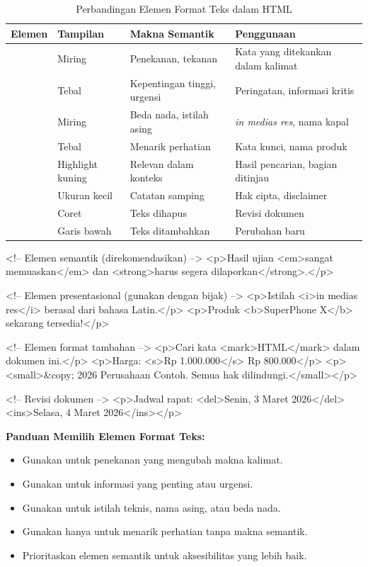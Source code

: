 \begin{table}[H]
\centering
\begin{tabular}{|P{2cm}|P{2cm}|P{3.5cm}|P{4cm}|}
\hline
\textbf{Elemen} & \textbf{Tampilan} & \textbf{Makna Semantik} & \textbf{Penggunaan} \\
\hline
{} & Miring & Penekanan, tekanan & Kata yang ditekankan dalam kalimat \\
\hline
{} & Tebal & Kepentingan tinggi, urgensi & Peringatan, informasi kritis \\
\hline
{} & Miring & Beda nada, istilah asing & \textit{in medias res}, nama kapal \\
\hline
{} & Tebal & Menarik perhatian & Kata kunci, nama produk \\
\hline
{} & Highlight kuning & Relevan dalam konteks & Hasil pencarian, bagian ditinjau \\
\hline
{} & Ukuran kecil & Catatan samping & Hak cipta, disclaimer \\
\hline
{} & Coret & Teks dihapus & Revisi dokumen \\
\hline
{} & Garis bawah & Teks ditambahkan & Perubahan baru \\
\hline
\end{tabular}
\caption{Perbandingan Elemen Format Teks dalam HTML}
\label{tab:text-formatting}
\end{table}

\begin{webcode}[language=HTML, caption={Contoh Elemen Format Teks}]
<!-- Elemen semantik (direkomendasikan) -->
<p>Hasil ujian <em>sangat memuaskan</em> dan 
   <strong>harus segera dilaporkan</strong>.</p>

<!-- Elemen presentasional (gunakan dengan bijak) -->
<p>Istilah <i>in medias res</i> berasal dari bahasa Latin.</p>
<p>Produk <b>SuperPhone X</b> sekarang tersedia!</p>

<!-- Elemen format tambahan -->
<p>Cari kata <mark>HTML</mark> dalam dokumen ini.</p>
<p>Harga: <s>Rp 1.000.000</s> Rp 800.000</p>
<p><small>&copy; 2026 Perusahaan Contoh. 
   Semua hak dilindungi.</small></p>

<!-- Revisi dokumen -->
<p>Jadwal rapat: <del>Senin, 3 Maret 2026</del> 
   <ins>Selasa, 4 Maret 2026</ins></p>
\end{webcode}

\begin{catatan}
\textbf{Panduan Memilih Elemen Format Teks:}
\begin{itemize}[leftmargin=*]
  \item Gunakan  untuk penekanan yang mengubah makna kalimat.
  \item Gunakan  untuk informasi yang penting atau urgensi.
  \item Gunakan  untuk istilah teknis, nama asing, atau beda nada.
  \item Gunakan  hanya untuk menarik perhatian tanpa makna semantik.
  \item Prioritaskan elemen semantik untuk aksesibilitas yang lebih baik.
\end{itemize}
\end{catatan}


